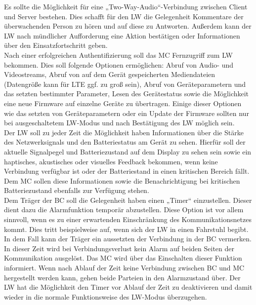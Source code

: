 \documentclass[thesis.tex]{subfiles}
\begin{document}
Es sollte die Möglichkeit für eine „Two-Way-Audio“-Verbindung zwischen Client und Server bestehen.
Dies schafft für den LW die Gelegenheit Kommentare der überwachenden Person zu hören und auf diese zu Antworten.
Außerdem kann der LW nach mündlicher Aufforderung eine Aktion bestätigen oder Informationen über den Einsatzfortschritt geben.
\\

Nach einer erfolgreichen Authentifizierung soll das MC Fernzugriff zum LW bekommen.
Dies soll folgende Optionen ermöglichen: Abruf von Audio- und Videostreams, Abruf von auf dem Gerät gespeicherten Mediendateien
(Datengröße kann für LTE ggf. zu groß sein), Abruf von Geräteparametern und das setzten bestimmter Parameter, Lesen des Gerätestatus
sowie die Möglichkeit eine neue Firmware auf einzelne Geräte zu übertragen.
Einige dieser Optionen wie das setzten von Geräteparametern oder ein Update der Firmware sollten nur bei ausgeschaltetem LW-Modus
und nach Bestätigung des LW möglich sein.
\\

Der LW soll zu jeder Zeit die Möglichkeit haben Informationen über die Stärke des Netzwerksignals und den Batteriestatus am Gerät zu sehen.
Hierfür soll der aktuelle Signalpegel und Batteriezustand auf dem Display zu sehen sein sowie ein haptisches, akustisches oder visuelles
Feedback bekommen, wenn keine Verbindung verfügbar ist oder der Batteriestand in einen kritischen Bereich fällt.
Dem MC sollen diese Informationen sowie die Benachrichtigung bei kritischen Batteriezustand ebenfalls zur Verfügung stehen.
\\

Dem Träger der BC soll die Gelegenheit haben einen „Timer“ einzustellen.
Dieser dient dazu die Alarmfunktion temporär abzustellen.
Diese Option ist vor allem sinnvoll, wenn es zu einer erwartenden Einschränkung des Kommunikationsnetzes kommt.
Dies tritt beispielweise auf, wenn sich der LW in einen Fahrstuhl begibt.
In dem Fall kann der Träger ein aussetzten der Verbindung in der BC vermerken.
In dieser Zeit wird bei Verbindungsverlust kein Alarm auf beiden Seiten der Kommunikation ausgelöst.
Das MC wird über das Einschalten dieser Funktion informiert.
Wenn nach Ablauf der Zeit keine Verbindung zwischen BC und MC hergestellt werden kann, gehen beide Parteien in den Alarmzustand über.
Der LW hat die Möglichkeit den Timer vor Ablauf der Zeit zu deaktivieren und damit wieder in die normale Funktionsweise des LW-Modus überzugehen.
\\
\end{document}
